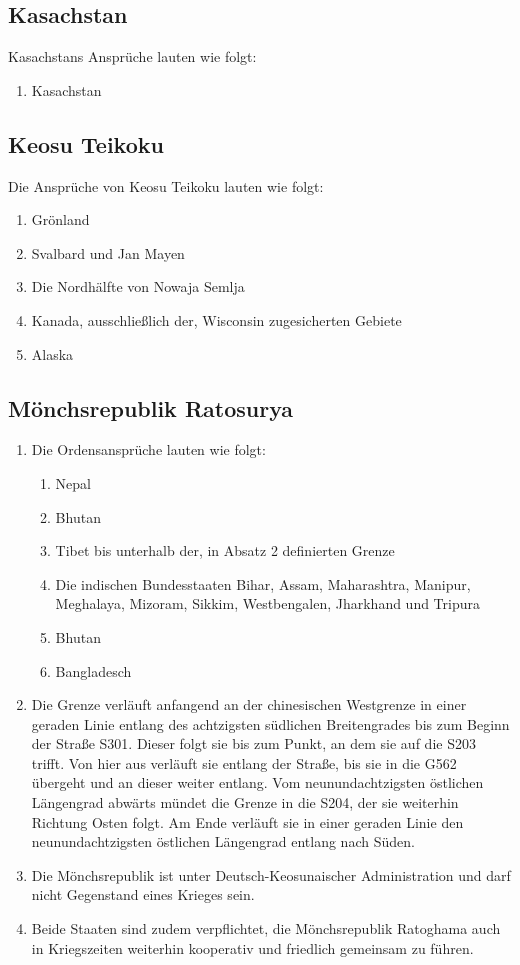 \documentclass{article}
\begin{document}
\subsection{Kasachstan}
Kasachstans Ansprüche lauten wie folgt:
\begin{enumerate}
    \item Kasachstan
\end{enumerate}

\subsection{Keosu Teikoku}
Die Ansprüche von Keosu Teikoku lauten wie folgt:
\begin{enumerate}
    \item Grönland
    \item Svalbard und Jan Mayen
    \item Die Nordhälfte von Nowaja Semlja
    \item Kanada, ausschließlich der, Wisconsin zugesicherten Gebiete
    \item Alaska
\end{enumerate}

\subsection{Mönchsrepublik Ratosurya}
\begin{enumerate}[(1)]
    \item Die Ordensansprüche lauten wie folgt:
    \begin{enumerate}
        \item Nepal
        \item Bhutan
        \item Tibet bis unterhalb der, in Absatz 2 definierten Grenze
        \item Die indischen Bundesstaaten Bihar, Assam, Maharashtra, Manipur, Meghalaya, Mizoram, Sikkim, Westbengalen, Jharkhand und Tripura
        \item Bhutan
        \item Bangladesch
    \end{enumerate}
    \item Die Grenze verläuft anfangend an der chinesischen Westgrenze in einer geraden Linie entlang des achtzigsten südlichen Breitengrades
    bis zum Beginn der Straße S301. Dieser folgt sie bis zum Punkt, an dem sie auf die S203 trifft. Von hier aus verläuft sie entlang der Straße,
    bis sie in die G562 übergeht und an dieser weiter entlang. Vom neunundachtzigsten östlichen Längengrad abwärts mündet die Grenze in die S204, der sie weiterhin Richtung Osten folgt.
    Am Ende verläuft sie in einer geraden Linie den neunundachtzigsten östlichen Längengrad entlang nach Süden. 
    \item Die Mönchsrepublik ist unter Deutsch-Keosunaischer Administration und darf nicht Gegenstand eines Krieges sein.
    \item Beide Staaten sind zudem verpflichtet, die Mönchsrepublik Ratoghama auch in Kriegszeiten weiterhin kooperativ und friedlich gemeinsam zu führen.
\end{enumerate}
\end{document}
